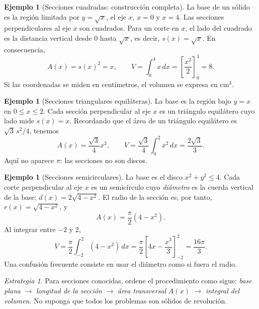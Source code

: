 \documentclass[12pt]{article}
\theoremstyle{definition}
\newtheorem{ejemplo}[teorema]{Ejemplo}
\theoremstyle{remark}
\newtheorem*{estrategia}{Estrategia}
\begin{document}
\begin{ejemplo}[Secciones cuadradas: construcción completa]
La base de un sólido es la región limitada por $y=\sqrt x$, el eje $x$, $x=0$ y $x=4$. Las secciones perpendiculares al eje $x$ son cuadrados. Para un corte en $x$, el lado del cuadrado es la distancia vertical desde $0$ hasta $\sqrt x$, es decir, $s(x)=\sqrt x$. En consecuencia,
\[
A(x)=s(x)^2=x,
\qquad
V=\int_0^4x\,dx=\left[\frac{x^2}{2}\right]_0^4
=\boxed{8}.
\]
Si las coordenadas se miden en centímetros, el volumen se expresa en $\mathrm{cm^3}$.
\end{ejemplo}
\begin{ejemplo}[Secciones triangulares equiláteras]
La base es la región bajo $y=x$ en $0\le x\le2$. Cada sección perpendicular al eje $x$ es un triángulo equilátero cuyo lado mide $s(x)=x$. Recordando que el área de un triángulo equilátero es $\sqrt3\,s^2/4$, tenemos
\[
A(x)=\frac{\sqrt3}{4}x^2,
\qquad
V=\frac{\sqrt3}{4}\int_0^2x^2\,dx
=\boxed{\frac{2\sqrt3}{3}}.
\]
Aquí no aparece $\pi$: las secciones no son discos.
\end{ejemplo}
\begin{ejemplo}[Secciones semicirculares]
La base es el disco $x^2+y^2\le4$. Cada corte perpendicular al eje $x$ es un semicírculo cuyo \emph{diámetro} es la cuerda vertical de la base: $d(x)=2\sqrt{4-x^2}$. El radio de la sección es, por tanto, $r(x)=\sqrt{4-x^2}$, y
\[
A(x)=\frac\pi2(4-x^2).
\]
Al integrar entre $-2$ y $2$,
\[
V=\frac\pi2\int_{-2}^2(4-x^2)\,dx
=\frac\pi2\left[4x-\frac{x^3}{3}\right]_{-2}^2
=\boxed{\frac{16\pi}{3}}.
\]
Una confusión frecuente consiste en usar el diámetro como si fuera el radio.
\end{ejemplo}
\begin{estrategia}
Para secciones conocidas, ordene el procedimiento como sigue: \emph{base plana} $\longrightarrow$ \emph{longitud de la sección} $\longrightarrow$ \emph{área transversal} $A(x)$ $\longrightarrow$ \emph{integral del volumen}. No suponga que todos los problemas son sólidos de revolución.
\end{estrategia}
\end{document}
